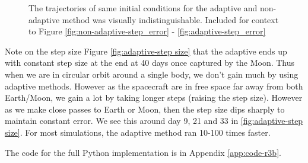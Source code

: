 \begin{figure}
{        }
        \caption{The trajectories of same initial conditions for the adaptive and non-adaptive method was visually indistinguishable. Included for context to Figure \ref{fig:non-adaptive-step_error} - \ref{fig:adaptive-step_error}}
        \label{fig:adaptive-xy_XY}
\end{figure}


Note on the step size Figure \ref{fig:adaptive-step size} that the adaptive ends up with constant step size at the end at 40 days once captured by the Moon. Thus when we are in circular orbit around a single body, we don't gain much by using adaptive methods. However as the spacecraft are in free space far away from both Earth/Moon, we gain a lot by taking longer steps (raising the step size). However as we make close passes to Earth or Moon, then the step size dips sharply to maintain constant error. We see this around day 9, 21 and 33 in \ref{fig:adaptive-step size}. For most simulations, the adaptive method ran 10-100 times faster.

The code for the full Python implementation is in Appendix \ref{app:code-r3b}.

